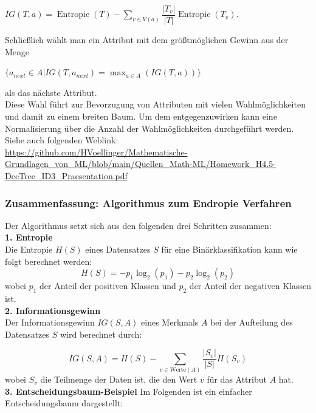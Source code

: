 \documentclass[12pt]{article}
\begin{document}
\begin{center}
$ IG(T, a) = \operatorname{Entropie}(T) - \sum_{v \in V(a)} \dfrac{|T_v|}{|T|} \operatorname{Entropie} (T_v) $. \\
\end{center}
Schließlich wählt man ein Attribut mit dem größtmöglichen Gewinn aus der Menge 
\begin{center} 
$\lbrace a_{next} \in A | IG(T, a_{next}) = \max_{a \in A}(IG(T, a)) \rbrace $ 
\end{center}
als das nächste Attribut.\\[0.2cm]
Diese Wahl führt zur Bevorzugung von Attributen mit vielen Wahlmöglichkeiten und damit zu einem breiten Baum. Um dem entgegenzuwirken kann eine Normalisierung über die Anzahl der Wahlmöglichkeiten durchgeführt werden.\\
Siehe auch folgenden Weblink:\\
\url{https://github.com/HVoellinger/Mathematische-Grundlagen_von_ML/blob/main/Quellen_Math-ML/Homework_H4.5-DecTree_ID3_Praesentation.pdf}\\[0.2cm]
%
\subsubsection{Zusammenfassung: Algorithmus zum Endropie Verfahren}
%
Der Algorithmus setzt sich aus den folgenden drei Schritten zusammen:\\
\textbf{1. Entropie}\\
%
Die Entropie \( H(S) \) eines Datensatzes \( S \) für eine Binärklassifikation kann wie folgt berechnet werden:
%
\[
H(S) = -p_1 \log_2(p_1) - p_2 \log_2(p_2)
\]
%
wobei \( p_1 \) der Anteil der positiven Klassen und \( p_2 \) der Anteil der negativen Klassen ist.\\
%
\textbf{2. Informationsgewinn}\\
%
Der Informationsgewinn \( IG(S, A) \) eines Merkmals \( A \) bei der Aufteilung des Datensatzes \( S \) wird berechnet durch:

\[
IG(S, A) = H(S) - \sum_{v \in \text{Werte}(A)} \frac{|S_v|}{|S|} H(S_v)
\]
%
wobei \( S_v \) die Teilmenge der Daten ist, die den Wert \( v \) für das Attribut \( A \) hat.\\
%
\textbf{3. Entscheidungsbaum-Beispiel}
%
Im Folgenden ist ein einfacher Entscheidungsbaum dargestellt:
\end{document}
